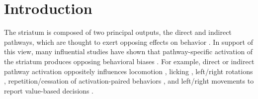 \section{Introduction}
\label{sec:glmhmm:glmhmm-intro}

The striatum is composed of two principal outputs, the direct and indirect pathways, which are thought to exert opposing effects on behavior \cite{alexander_functional_1990}. In support of this view, many influential studies have shown that pathway-specific activation of the striatum produces opposing behavioral biases \cite{kravitz_regulation_2010, roseberry_cell-type-specific_2016, bartholomew_striatonigral_2016, bakhurin_opponent_2020, lobo_cell_2010, kravitz_distinct_2012,yttri_opponent_2016,tai_transient_2012,nonomura_monitoring_2018,lee_anatomically_2020,cui_multi-ensemble_2022,tang_opposing_2021,parker_diametric_2018}. For example, direct or indirect pathway activation oppositely influences locomotion \cite{kravitz_regulation_2010,roseberry_cell-type-specific_2016,bartholomew_striatonigral_2016,parker_diametric_2018}, licking \cite{bakhurin_opponent_2020,lee_anatomically_2020,chen_direct_2021}, left/right rotations \cite{kravitz_regulation_2010,roseberry_cell-type-specific_2016,lee_anatomically_2020,lee_activation_2016}, repetition/cessation of activation-paired behaviors \cite{lobo_cell_2010,kravitz_distinct_2012,yttri_opponent_2016}, and left/right movements to report value-based decisions \cite{tai_transient_2012,tang_opposing_2021}.

